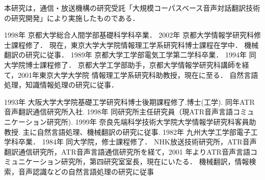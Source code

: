 \documentclass{nlp}
\begin{document}
\acknowledgment
本研究は，通信・放送機構の研究受託「大規模コーパスベース音声対話翻訳技術の研究開発」により実施したものである．






\begin{biography}
{
	1998年 京都大学総合人間学部基礎科学科卒業．
	2002年 京都大学情報学研究科修士課程修了．
	現在，東京大学大学院情報理工学系研究科博士課程在学中．
	機械翻訳の研究に従事．
}
{
	1989年 京都大学工学部電気工学第二学科卒業．
	1994年 同大学院博士課程修了．
	京都大学工学部助手，京都大学情報学研究科講師を経て，2001年東京大学大学院
	情報理工学系研究科助教授，現在に至る．
	自然言語処理，知識情報処理の研究に従事．
}

{
	1993年 大阪大学大学院基礎工学研究科博士後期課程修了.博士(工学).
	同年ATR音声翻訳通信研究所入社.
	1998年 同研究所主任研究員（現ATR音声言語コミュニケーション研究所).
	1999年 奈良先端科学技術大学院大学情報学研究科客員助教授.
	主に自然言語処理、機械翻訳の研究に従事.
}
{
	1982年 九州大学工学部電子工学科卒業．
	1984年 同大学院，修士課程修了．
	NHK放送技術研究所，ATR音声翻訳通信研究所，ATR音声言語通信研究所を経て，2001
	年よりATR音声言語コミュニケーション研究所，第四研究室室長，現在にいたる．
	機械翻訳，情報検索，音声認識などの自然言語処理の研究に従事
}
\end{biography}
\end{document}
